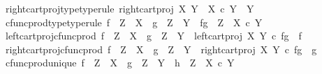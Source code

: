 \begin{isabellebody}
\ \ right{\isacharunderscore}{\kern0pt}cart{\isacharunderscore}{\kern0pt}proj{\isacharunderscore}{\kern0pt}type{\isacharbrackleft}{\kern0pt}type{\isacharunderscore}{\kern0pt}rule{\isacharbrackright}{\kern0pt}{\isacharcolon}{\kern0pt}\ {\isachardoublequoteopen}right{\isacharunderscore}{\kern0pt}cart{\isacharunderscore}{\kern0pt}proj\ X\ Y\ {\isacharcolon}{\kern0pt}\ X\ {\isasymtimes}\isactrlsub c\ Y\ {\isasymrightarrow}\ Y{\isachardoublequoteclose}\ \isanewline
\ \ cfunc{\isacharunderscore}{\kern0pt}prod{\isacharunderscore}{\kern0pt}type{\isacharbrackleft}{\kern0pt}type{\isacharunderscore}{\kern0pt}rule{\isacharbrackright}{\kern0pt}{\isacharcolon}{\kern0pt}\ {\isachardoublequoteopen}f\ {\isacharcolon}{\kern0pt}\ Z\ {\isasymrightarrow}\ X\ {\isasymLongrightarrow}\ g\ {\isacharcolon}{\kern0pt}\ Z\ {\isasymrightarrow}\ Y\ {\isasymLongrightarrow}\ {\isasymlangle}f{\isacharcomma}{\kern0pt}g{\isasymrangle}\ {\isacharcolon}{\kern0pt}\ Z\ {\isasymrightarrow}\ X\ {\isasymtimes}\isactrlsub c\ Y{\isachardoublequoteclose}\ \isanewline
\ \ left{\isacharunderscore}{\kern0pt}cart{\isacharunderscore}{\kern0pt}proj{\isacharunderscore}{\kern0pt}cfunc{\isacharunderscore}{\kern0pt}prod{\isacharcolon}{\kern0pt}\ {\isachardoublequoteopen}f\ {\isacharcolon}{\kern0pt}\ Z\ {\isasymrightarrow}\ X\ {\isasymLongrightarrow}\ g\ {\isacharcolon}{\kern0pt}\ Z\ {\isasymrightarrow}\ Y\ {\isasymLongrightarrow}\ left{\isacharunderscore}{\kern0pt}cart{\isacharunderscore}{\kern0pt}proj\ X\ Y\ {\isasymcirc}\isactrlsub c\ {\isasymlangle}f{\isacharcomma}{\kern0pt}g{\isasymrangle}\ {\isacharequal}{\kern0pt}\ f{\isachardoublequoteclose}\ \isanewline
\ \ right{\isacharunderscore}{\kern0pt}cart{\isacharunderscore}{\kern0pt}proj{\isacharunderscore}{\kern0pt}cfunc{\isacharunderscore}{\kern0pt}prod{\isacharcolon}{\kern0pt}\ {\isachardoublequoteopen}f\ {\isacharcolon}{\kern0pt}\ Z\ {\isasymrightarrow}\ X\ {\isasymLongrightarrow}\ g\ {\isacharcolon}{\kern0pt}\ Z\ {\isasymrightarrow}\ Y\ {\isasymLongrightarrow}\ right{\isacharunderscore}{\kern0pt}cart{\isacharunderscore}{\kern0pt}proj\ X\ Y\ {\isasymcirc}\isactrlsub c\ {\isasymlangle}f{\isacharcomma}{\kern0pt}g{\isasymrangle}\ {\isacharequal}{\kern0pt}\ g{\isachardoublequoteclose}\ \isanewline
\ \ cfunc{\isacharunderscore}{\kern0pt}prod{\isacharunderscore}{\kern0pt}unique{\isacharcolon}{\kern0pt}\ {\isachardoublequoteopen}f\ {\isacharcolon}{\kern0pt}\ Z\ {\isasymrightarrow}\ X\ {\isasymLongrightarrow}\ g\ {\isacharcolon}{\kern0pt}\ Z\ {\isasymrightarrow}\ Y\ {\isasymLongrightarrow}\ h\ {\isacharcolon}{\kern0pt}\ Z\ {\isasymrightarrow}\ X\ {\isasymtimes}\isactrlsub c\ Y\ {\isasymLongrightarrow}\ \isanewline

\end{isabellebody}
